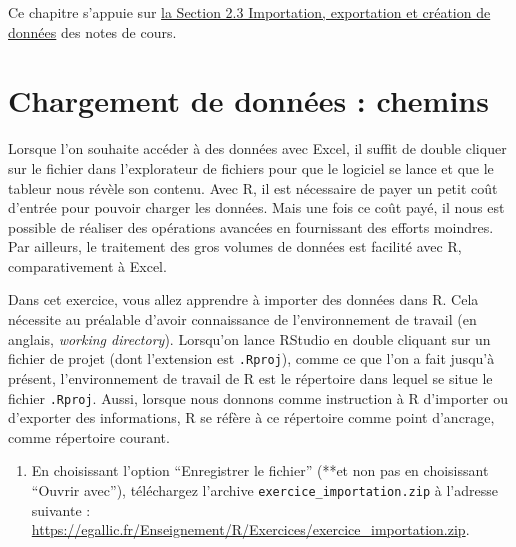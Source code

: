 \documentclass[
  11pt,
]{book}
\providecommand{\tightlist}{%
  \setlength{\itemsep}{0pt}\setlength{\parskip}{0pt}}
\numberwithin{equation}{section}
\numberwithin{countremarque}{section}
\newenvironment{greenbox}{
  \begin{tcolorbox}[breakable, colback=vert,coltext=black,
                  colframe=grisfonce]}
 {\end{tcolorbox}}
\newenvironment{orangebox}{
  \begin{tcolorbox}[breakable, colback=oran,coltext=white,
                  colframe=grisfonce]}
 {\end{tcolorbox}}
\begin{document}
\begin{orangebox}
Ce chapitre s'appuie sur \href{http://egallic.fr/Enseignement/R/Book/donn\%C3\%A9es.html\#importation-exportation-et-cr\%C3\%A9ation-de-donn\%C3\%A9es}{la Section 2.3 Importation, exportation et création de données} des notes de cours.

\end{orangebox}

\hypertarget{chargement-de-donnuxe9es-chemins}{%
\section{Chargement de données : chemins}\label{chargement-de-donnuxe9es-chemins}}

Lorsque l'on souhaite accéder à des données avec Excel, il suffit de double cliquer sur le fichier dans l'explorateur de fichiers pour que le logiciel se lance et que le tableur nous révèle son contenu. Avec R, il est nécessaire de payer un petit coût d'entrée pour pouvoir charger les données. Mais une fois ce coût payé, il nous est possible de réaliser des opérations avancées en fournissant des efforts moindres. Par ailleurs, le traitement des gros volumes de données est facilité avec R, comparativement à Excel.

Dans cet exercice, vous allez apprendre à importer des données dans R. Cela nécessite au préalable d'avoir connaissance de l'environnement de travail (en anglais, \emph{working directory}). Lorsqu'on lance RStudio en double cliquant sur un fichier de projet (dont l'extension est \texttt{.Rproj}), comme ce que l'on a fait jusqu'à présent, l'environnement de travail de R est le répertoire dans lequel se situe le fichier \texttt{.Rproj}. Aussi, lorsque nous donnons comme instruction à R d'importer ou d'exporter des informations, R se réfère à ce répertoire comme point d'ancrage, comme répertoire courant.

\begin{greenbox}

\begin{enumerate}
\def\labelenumi{\arabic{enumi}.}
\tightlist
\item
  En choisissant l'option ``Enregistrer le fichier'' (**et non pas en choisissant ``Ouvrir avec''), téléchargez l'archive \texttt{exercice\_importation.zip} à l'adresse suivante : \url{https://egallic.fr/Enseignement/R/Exercices/exercice_importation.zip}.
\end{enumerate}

\end{greenbox}
\end{document}
